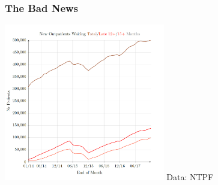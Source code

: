 

\begin{frame}
\frametitle{The Bad News}
\includegraphics[width=7cm]{imagesoutpatient/newoutpatientswaitingdec2017}
{\scriptsize Data: NTPF}
\end{frame}




